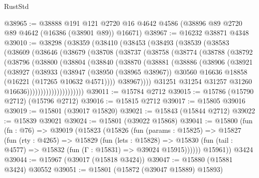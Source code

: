 \begin{lexlean}{RustStd}
\begin{coremodule}
@38965 := @38888
    @191
    @121
    @2720
    @16
    @4642
    @4586
    (@38896 @89 @2720 @89 @4642 (@16386 (@38901 @89)) @16671)
@38967 := @16232 @38871 @4348
@39010 := @38298
    (@38359
      (@38410
        (@38453
          (@38493
            (@38539
              (@38583
                (@38609
                  (@38646
                    (@38679
                      (@38708
                        (@38737
                          (@38758
                            (@38774
                              (@38788
                                (@38792
                                  (@38796
                                    (@38800
                                      (@38804
                                        (@38840
                                          (@38870
                                            (@38881
                                              (@38886
                                                (@38906
                                                  (@38921
                                                    (@38927
                                                      (@38933
                                                        (@38947
                                                          (@38950 (@38965 @38967))
                                                          @30560
                                                          @16636
                                                          @18858
                                                          (@16221 (@17265 @10632 @4571))))
                                                      @38967))))
                                              @31251
                                              @31254
                                              @31257
                                              @31260
                                              @16636)))))))))))))))))))))
@39011 := @15784 @2712
@39015 := @15786 (@15790 @2712) (@15796 @2712)
@39016 := @15815 @2712
@39017 := @15805 @39016
@39019 := @15801 (@39017 @15820)
@39021 := @15843 (@15844 @2712)
@39022 := @15839 @39021
@39024 := @15801 (@39022 @15868)
@39041 := @15800
    (fun (fn : @76) =>
    @39019
      (@15823
        (@15826
          (fun (params : @15825) =>
          @15827
            (fun (rty : @4265) =>
            @15829
              (fun (lets : @15828) =>
              @15830 (fun (tail : @4577) => @15832 (fun (Γ : @15831) => @39024 @15915))))))
        @15961))
    @3424
@39044 := @15967 (@39017 (@15818 @3424))
@39047 := @15880 (@15881 @3424) @30552
@39051 := @15801 (@15872 (@39047 @15889) @15893)

\end{coremodule}
\end{lexlean}
